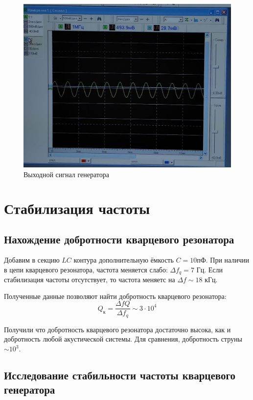 \documentclass[a4paper, 14pt]{extarticle}
\begin{document}
\begin{figure}[htbp]
    \centering
    \includegraphics[width = 1\textwidth]{osc.jpg}
    \caption{Выходной сигнал генератора}
    \label{fig:osc}
\end{figure}

\section*{\textcolor{header}{Стабилизация частоты}}

\subsection*{\textcolor{sub_header}{Нахождение добротности кварцевого резонатора}}

Добавим в секцию $LC$ контура дополнительную ёмкость $C = 10 \text{пФ}$. 
При наличии в цепи кварцевого резонатора, 
частота меняется слабо: $\Delta f_{q} = 7 \text{ Гц}$. 
Если стабилизация частоты отсутствует, то частота меняетс на $\Delta f \sim 18 \text{ кГц}$. 

Полученные данные позволяют найти добротность кварцевого резонатора:
\begin{equation}
    Q_{\text{к}} = \frac{\Delta f Q}{\Delta f_{q}} \sim 3 \cdot 10^{4}
\end{equation}

Получили что добротность кварцевого резонатора достаточно высока, как и добротность любой
акустической системы. Для сравнения, добротность струны $\sim 10^3$.

\subsection*{\textcolor{sub_header}{Исследование стабильности частоты кварцевого генератора}}
\end{document}
